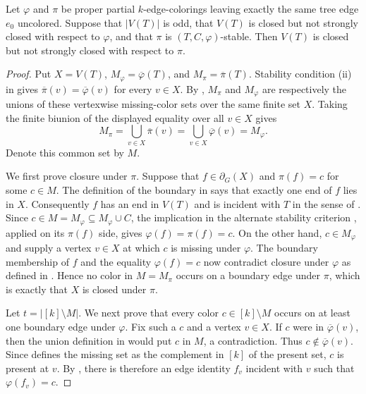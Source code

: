 \begin{lemma}
Let $\varphi$ and $\pi$ be proper partial $k$-edge-colorings leaving exactly
the same tree edge $e_0$ uncolored.  Suppose that $|V(T)|$ is odd, that
$V(T)$ is closed but not strongly closed with respect to $\varphi$, and
that $\pi$ is $(T,C,\varphi)$-stable.  Then $V(T)$ is closed but not
strongly closed with respect to $\pi$.
\end{lemma}
\begin{proof}
Put $X=V(T)$, $M_\varphi=\overline\varphi(T)$, and
$M_\pi=\overline\pi(T)$.  Stability condition (ii) in
 gives
$\overline\pi(v)=\overline\varphi(v)$ for every $v\in X$.
By , $M_\pi$ and $M_\varphi$ are respectively
the unions of these vertexwise missing-color sets over the same finite set
$X$.  Taking the finite biunion of the displayed equality over all
$v\in X$ gives
\[
 M_\pi=\bigcup_{v\in X}\overline\pi(v)
      =\bigcup_{v\in X}\overline\varphi(v)=M_\varphi.
\]
Denote this common set by $M$.

We first prove closure under $\pi$.  Suppose that $f\in\partial_G(X)$ and
$\pi(f)=c$ for some $c\in M$.  The definition of the boundary in
 says that exactly one end of $f$ lies in $X$.
Consequently $f$ has an end in $V(T)$ and is incident with $T$ in the
sense of .  Since
$c\in M=M_\varphi\subseteq M_\varphi\cup C$, the implication in the
alternate stability criterion , applied on its $\pi(f)$ side,
gives $\varphi(f)=\pi(f)=c$.  On the other hand,
$c\in M_\varphi$ and  supply a vertex
$v\in X$ at which $c$ is missing under $\varphi$.  The boundary membership
of $f$ and the equality $\varphi(f)=c$ now contradict closure under
$\varphi$ as defined in .  Hence no color
in $M=M_\pi$ occurs on a boundary edge under $\pi$, which is exactly that
$X$ is closed under $\pi$.

Let $t=|[k]\setminus M|$.  We next prove that every color
$c\in[k]\setminus M$ occurs on at least one boundary edge under
$\varphi$.  Fix such a $c$ and a vertex $v\in X$.  If $c$ were in
$\overline\varphi(v)$, then the union definition in
 would put $c$ in $M$, a contradiction.  Thus
$c\notin\overline\varphi(v)$.  Since  defines the
missing set as the complement in $[k]$ of the present set, $c$ is present
at $v$.  By , there is therefore an edge identity
$f_v$ incident with $v$ such that $\varphi(f_v)=c$.


\end{proof}
